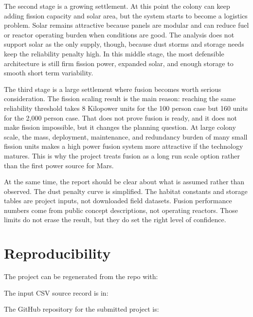 \documentclass[11pt]{article}
\begin{document}
The second stage is a growing settlement. At this point the colony can keep adding fission capacity and solar area, but the system starts to become a logistics problem. Solar remains attractive because panels are modular and can reduce fuel or reactor operating burden when conditions are good. The analysis does not support solar as the only supply, though, because dust storms and storage needs keep the reliability penalty high. In this middle stage, the most defensible architecture is still firm fission power, expanded solar, and enough storage to smooth short term variability.

The third stage is a large settlement where fusion becomes worth serious consideration. The fission scaling result is the main reason: reaching the same reliability threshold takes 8 Kilopower units for the 100 person case but 160 units for the 2{,}000 person case. That does not prove fusion is ready, and it does not make fission impossible, but it changes the planning question. At large colony scale, the mass, deployment, maintenance, and redundancy burden of many small fission units makes a high power fusion system more attractive if the technology matures. This is why the project treats fusion as a long run scale option rather than the first power source for Mars.

At the same time, the report should be clear about what is assumed rather than observed. The dust penalty curve is simplified. The habitat constants and storage tables are project inputs, not downloaded field datasets. Fusion performance numbers come from public concept descriptions, not operating reactors. Those limits do not erase the result, but they do set the right level of confidence.

\section{Reproducibility}

The project can be regenerated from the repo with:

\begin{center}
\end{center}

The input CSV source record is in:

\begin{center}
\end{center}

The GitHub repository for the submitted project is:
\end{document}
